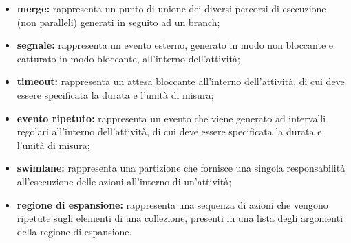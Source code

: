 \begin{itemize}[leftmargin=1.5cm]
							\item \textbf{merge:} rappresenta un punto di unione dei diversi percorsi di esecuzione (non paralleli) generati in seguito ad un branch;
							\item \textbf{segnale:} rappresenta un evento esterno, generato in modo non bloccante e catturato in modo bloccante, all'interno dell'attività;
							\item \textbf{timeout:} rappresenta un attesa bloccante all'interno dell'attività, di cui deve essere specificata la durata e l'unità di misura;
							\item \textbf{evento ripetuto:} rappresenta un evento che viene generato ad intervalli regolari all'interno dell'attività, di cui deve essere specificata la durata e l'unità di misura;
							\item \textbf{swimlane:} rappresenta una partizione che fornisce una singola responsabilità all'esecuzione delle azioni all'interno di un'attività;
							\item \textbf{regione di espansione:} rappresenta una sequenza di azioni che vengono ripetute sugli elementi di una collezione, presenti in una lista degli argomenti della regione di espansione.
						\end{itemize}

